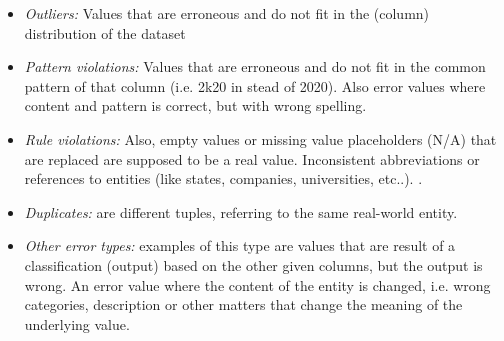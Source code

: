 \begin{itemize}
    \item \textit{Outliers:} Values that are erroneous and do not fit in the (column) distribution of the dataset
    \item \textit{Pattern violations:} Values that are erroneous and do not fit in the common pattern of that column (i.e. 2k20 in stead of 2020). Also error values where content and pattern is correct, but with wrong spelling.
    \item \textit{Rule violations:} Also, empty values or missing value placeholders (N/A) that are replaced are supposed to be a real value. Inconsistent abbreviations or references to entities (like states, companies, universities, etc..).
    .\item \textit{Duplicates:} are different tuples, referring to the same real-world entity.
    \item \textit{Other error types:} examples of this type are values that are result of a classification (output) based on the other given columns, but the output is wrong. An error value where the content of the entity is changed, i.e. wrong categories, description or other matters that change the meaning of the underlying value.
\end{itemize}


